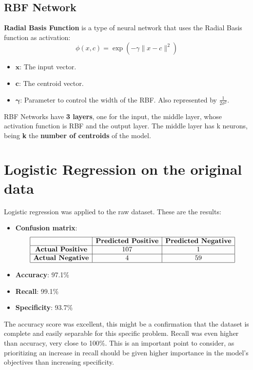 \documentclass[a4paper,12pt]{article}
\begin{document}
\subsection{RBF Network}
\textbf{Radial Basis Function} is a type of neural network that uses the Radial Basis function as activation:
\[
\phi(x, c) = \exp\left(-\gamma \|x - c\|^2\right)
\]
\begin{itemize}
    \item \(\mathbf{x}\): The input vector.
    \item \(\mathbf{c}\): The centroid vector.
    \item \(\mathbf{\gamma}\): Parameter to control the width of the RBF. Also represented by \(\frac{1}{2\sigma^2}\).
\end{itemize}

RBF Networks have \textbf{3 layers}, one for the input, the middle layer, whose activation function is RBF and the output layer. The middle layer has k neurons, being \textbf{k} the \textbf{number of centroids} of the model. 

\section{Logistic Regression on the original data}
\label{sec:logistic-regression-original}
Logistic regression was applied to the raw dataset. These are the results:
\begin{itemize}
    \item \textbf{Confusion matrix}: 
    \[
    \begin{array}{|c|c|c|}
    \hline
    & \textbf{Predicted Positive} & \textbf{Predicted Negative} \\
    \hline
    \textbf{Actual Positive} & 107 & 1 \\
    \hline
    \textbf{Actual Negative} & 4 & 59 \\
    \hline
    \end{array}
    \]
    \item \textbf{Accuracy}: 97.1\%
    \item \textbf{Recall}: 99.1\%
    \item \textbf{Specificity}: 93.7\%
    
\end{itemize}

The accuracy score was excellent, this might be a confirmation that the dataset is complete and easily separable for this specific problem. Recall was even higher than accuracy, very close to 100\%. This is an important point to consider, as prioritizing an increase in recall should be given higher importance in the model’s objectives than increasing specificity.
\end{document}
